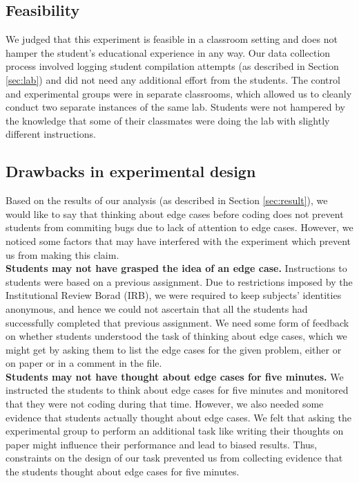 \documentclass[11pt,letterpaper]{article}
\begin{document}
\subsection{Feasibility}
We judged that this experiment is feasible in a classroom setting and does not hamper the student's educational experience in any way. Our data collection process involved logging student compilation attempts (as described in Section \ref{sec:lab}) and did not need any additional effort from the students. The control and experimental groups were in separate classrooms, which allowed us to cleanly conduct two separate instances of the same lab. Students were not hampered by the knowledge that some of their classmates were doing the lab with slightly different instructions.


\subsection{Drawbacks in experimental design}

Based on the results of our analysis (as described in Section \ref{sec:result}), we would like to say that thinking about edge cases before coding does not prevent students from commiting bugs due to lack of attention to edge cases. However, we noticed some factors that may have interfered with the experiment which prevent us from making this claim.\\

\textbf{Students may not have grasped the idea of an edge case.}
Instructions to students were based on a previous assignment. Due to restrictions imposed by the Institutional Review Borad (IRB), we were required to keep subjects' identities anonymous, and hence we could not ascertain that all the students had successfully completed that previous assignment. We need some form of feedback on whether students understood the task of thinking about edge cases, which we might get by asking them to list the edge cases for the given problem, either or on paper or in a comment in the file.\\

\textbf{Students may not have thought about edge cases for five minutes.} 
We instructed the students to think about edge cases for five minutes and monitored that they were not coding during that time. However, we also needed some evidence that students actually thought about edge cases. We felt that asking the experimental group to perform an additional task like writing their thoughts on paper might influence their performance and lead to biased results. Thus, constraints on the design of our task prevented us from collecting evidence that the students thought about edge cases for five minutes.\\
\end{document}
